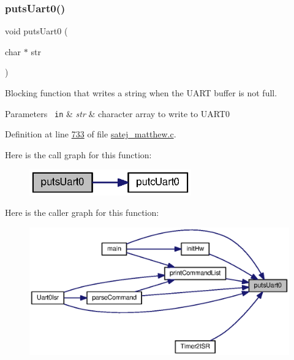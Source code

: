 \subsubsection{\texorpdfstring{putsUart0()}{putsUart0()}}
{\footnotesize\ttfamily void puts\+Uart0 (\begin{DoxyParamCaption}\item[{char $\ast$}]{str }\end{DoxyParamCaption})}



Blocking function that writes a string when the U\+A\+RT buffer is not full. 


\begin{DoxyParams}[1]{Parameters}
\mbox{\texttt{ in}}  & {\em str} & character array to write to U\+A\+R\+T0 \\
\hline
\end{DoxyParams}


Definition at line \mbox{\hyperlink{satej__matthew_8c_source_l00733}{733}} of file \mbox{\hyperlink{satej__matthew_8c_source}{satej\+\_\+matthew.\+c}}.

Here is the call graph for this function\+:
\nopagebreak
\begin{figure}[H]
\begin{center}
\leavevmode
\includegraphics[width=198pt]{satej__matthew_8c_af4adb618930ee1a928705aec083cf726_cgraph}
\end{center}
\end{figure}
Here is the caller graph for this function\+:
\nopagebreak
\begin{figure}[H]
\begin{center}
\leavevmode
\includegraphics[width=350pt]{satej__matthew_8c_af4adb618930ee1a928705aec083cf726_icgraph}
\end{center}
\end{figure}
\mbox{\label{satej__matthew_8c_a086130ac68735e2ba8d56b2dfe45b914}} 
